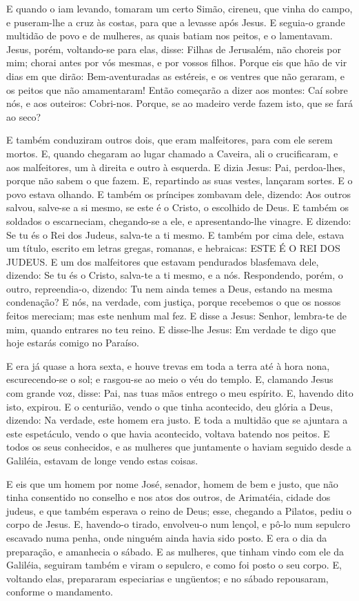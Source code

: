 E quando o iam levando, tomaram um certo Simão, cireneu, que
vinha do campo, e pu\-se\-ram-lhe a cruz às costas, para que a levasse
após Jesus. E seguia-o grande multidão de povo e de mulheres,
as quais batiam nos peitos, e o lamentavam. Jesus, porém,
voltando-se para elas, disse: Filhas de Jerusalém, não choreis por
mim; chorai antes por vós mesmas, e por vossos filhos. Porque
eis que hão de vir dias em que dirão: Bem-aventuradas as estéreis, e
os ventres que não geraram, e os peitos que não amamentaram!
Então começarão a dizer aos montes: Caí sobre nós, e aos
outeiros: Cobri-nos. Porque, se ao madeiro verde fazem isto,
que se fará ao seco?

E também conduziram outros dois, que eram malfeitores, para com
ele serem mortos. E, quando chegaram ao lugar chamado a
Caveira, ali o crucificaram, e aos malfeitores, um à direita e outro
à esquerda. E dizia Jesus: Pai, perdoa-lhes, porque não sabem
o que fazem. E, repartindo as suas vestes, lançaram sortes. E
o povo estava olhando. E também os príncipes zombavam dele, dizendo:
Aos outros salvou, salve-se a si mesmo, se este é o Cristo, o
escolhido de Deus. E também os soldados o escarneciam,
chegando-se a ele, e apresentando-lhe vinagre. E dizendo: Se
tu és o Rei dos Judeus, salva-te a ti mesmo. E também por
cima dele, estava um título, escrito em letras gregas, romanas, e
hebraicas: ESTE É O REI DOS JUDEUS. E um dos malfeitores que
estavam pendurados blasfemava dele, dizendo: Se tu és o Cristo,
salva-te a ti mesmo, e a nós. Respondendo, porém, o outro,
repreendia-o, dizendo: Tu nem ainda temes a Deus, estando na mesma
condenação? E nós, na verdade, com justiça, porque recebemos
o que os nossos feitos mereciam; mas este nenhum mal fez. E
disse a Jesus: Senhor, lembra-te de mim, quando entrares no teu
reino. E disse-lhe Jesus: Em verdade te digo que hoje estarás
comigo no Paraíso.

E era já quase a hora sexta, e houve trevas em toda a terra até à
hora nona, escurecendo-se o sol; e rasgou-se ao meio o véu do
templo. E, clamando Jesus com grande voz, disse: Pai, nas
tuas mãos entrego o meu espírito. E, havendo dito isto, expirou.
E o centurião, vendo o que tinha acontecido, deu glória a
Deus, dizendo: Na verdade, este homem era justo. E toda a
multidão que se ajuntara a este espetáculo, vendo o que havia
acontecido, voltava batendo nos peitos. E todos os seus
conhecidos, e as mulheres que juntamente o haviam seguido desde a
Galiléia, estavam de longe vendo estas coisas.

E eis que um homem por nome José, senador, homem de bem e justo,
que não tinha consentido no conselho e nos atos dos outros,
de Arimatéia, cidade dos judeus, e que também esperava o reino de
Deus; esse, chegando a Pilatos, pediu o corpo de Jesus.
E, havendo-o tirado, envolveu-o num lençol, e pô-lo num
sepulcro escavado numa penha, onde ninguém ainda havia sido posto.
E era o dia da preparação, e amanhecia o sábado. E as
mulheres, que tinham vindo com ele da Galiléia, seguiram também e
viram o sepulcro, e como foi posto o seu corpo. E, voltando
elas, prepararam especiarias e ungüentos; e no sábado repousaram,
conforme o mandamento.

